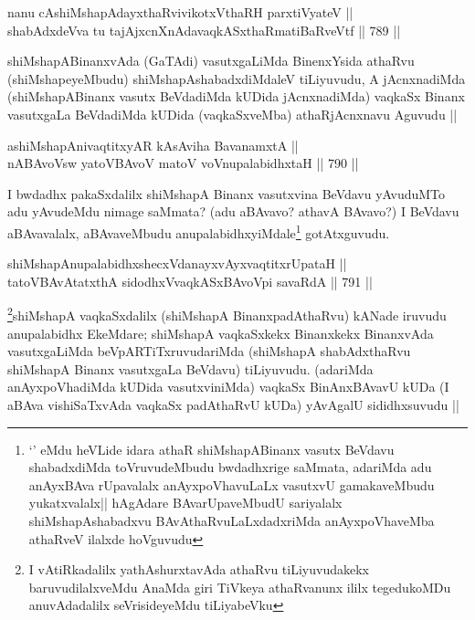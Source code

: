 \begin{shl}
nanu cAshiMshapAdayxthaRvivikotxV\s thaRH parxtiVyateV || \\
shabAdxdeVva tu tajAjxcnXnAdavaqkASxthaRmatiBaRveVtf ||  789 ||  
\end{shl}

\begin{artha}
shiMshapABinanxvAda (GaTAdi) vasutxgaLiMda BinenxYsida athaRvu (shiMshapeyeMbudu) shiMshapAshabadxdiMdaleV tiLiyuvudu, A jAcnxnadiMda (shiMshapABinanx vasutx BeVdadiMda kUDida jAcnxnadiMda) vaqkaSx Binanx vasutxgaLa BeVdadiMda kUDida (vaqkaSxveMba) athaRjAcnxnavu Aguvudu ||
\end{artha}


\begin{shl}
ashiMshapAnivaqtitxyAR kA\s sAviha BavanamxtA || \\
nABAvoV\s sw yatoV\s BAvoV matoV voV\s nupalabidhxtaH ||  790 ||  
\end{shl}

\begin{artha}
I bwdadhx pakaSxdalilx shiMshapA Binanx vasutxvina BeVdavu yAvuduMTo adu yAvudeMdu nimage saMmata? (adu aBAvavo? athavA BAvavo?) I BeVdavu aBAvavalalx, aBAvaveMbudu anupalabidhxyiMdale\footnote{`\stext' eMdu heVLide idara athaR shiMshapABinanx vasutx BeVdavu shabadxdiMda toVruvudeMbudu bwdadhxrige saMmata, adariMda adu anAyxBAva rUpavalalx anAyxpoVhavuLaLx vasutxvU gamakaveMbudu yukatxvalalx|| hAgAdare BAvarUpaveMbudU sariyalalx shiMshapAshabadxvu BAvAthaRvuLaLxdadxriMda anAyxpoVhaveMba athaRveV ilalxde hoVguvudu} gotAtxguvudu.
\end{artha}


\begin{shl}
shiMshapAnupalabidhxshecxVdanayxvAyxvaqtitxrUpataH || \\
tatoV\s BAvAtatxthA sidodhxV\s vaqkASxBAvoV\s pi savaRdA ||  791 ||  
\end{shl}

\begin{artha}
\footnote{I vAtiRkadalilx yathAshurxtavAda athaRvu tiLiyuvudakekx baruvudilalxveMdu AnaMda giri TiVkeya athaRvanunx ililx tegedukoMDu anuvAdadalilx seVrisideyeMdu tiLiyabeVku}shiMshapA vaqkaSxdalilx (shiMshapA BinanxpadAthaRvu) kANade iruvudu anupalabidhx EkeMdare; shiMshapA vaqkaSxkekx Binanxkekx BinanxvAda vasutxgaLiMda beVpARTiTxruvudariMda (shiMshapA shabAdxthaRvu shiMshapA Binanx vasutxgaLa BeVdavu) tiLiyuvudu. (adariMda anAyxpoVhadiMda kUDida vasutxviniMda) vaqkaSx BinAnxBAvavU kUDa (I aBAva vishiSaTxvAda vaqkaSx padAthaRvU kUDa) yAvAgalU sididhxsuvudu ||
\end{artha}

